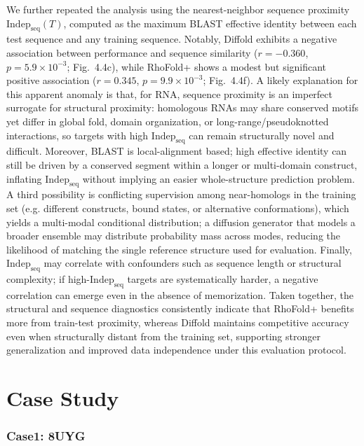 We further repeated the analysis using the nearest-neighbor sequence proximity $\mathrm{Indep}_{\mathrm{seq}}(T)$, computed as the maximum BLAST effective identity between each test sequence and any training sequence. Notably, Diffold exhibits a negative association between performance and sequence similarity ($r=-0.360$, $p=5.9\times10^{-3}$; Fig.~4.4c), while RhoFold+ shows a modest but significant positive association ($r=0.345$, $p=9.9\times10^{-3}$; Fig.~4.4f). A likely explanation for this apparent anomaly is that, for RNA, sequence proximity is an imperfect surrogate for structural proximity: homologous RNAs may share conserved motifs yet differ in global fold, domain organization, or long-range/pseudoknotted interactions, so targets with high $\mathrm{Indep}_{\mathrm{seq}}$ can remain structurally novel and difficult. Moreover, BLAST is local-alignment based; high effective identity can still be driven by a conserved segment within a longer or multi-domain construct, inflating $\mathrm{Indep}_{\mathrm{seq}}$ without implying an easier whole-structure prediction problem. A third possibility is conflicting supervision among near-homologs in the training set (e.g. different constructs, bound states, or alternative conformations), which yields a multi-modal conditional distribution; a diffusion generator that models a broader ensemble may distribute probability mass across modes, reducing the likelihood of matching the single reference structure used for evaluation. Finally, $\mathrm{Indep}_{\mathrm{seq}}$ may correlate with confounders such as sequence length or structural complexity; if high-$\mathrm{Indep}_{\mathrm{seq}}$ targets are systematically harder, a negative correlation can emerge even in the absence of memorization. Taken together, the structural and sequence diagnostics consistently indicate that RhoFold+ benefits more from train-test proximity, whereas Diffold maintains competitive accuracy even when structurally distant from the training set, supporting stronger generalization and improved data independence under this evaluation protocol.


\section{Case Study}

\subsubsection{Case1: 8UYG}

